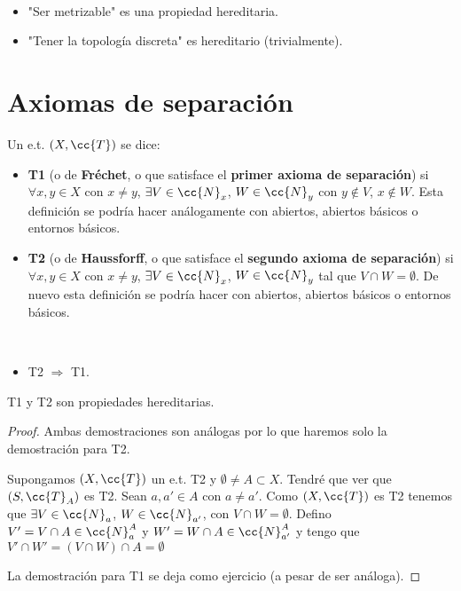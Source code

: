 \begin{ejemplo}\
    \begin{itemize}
        \item "Ser metrizable" es una propiedad hereditaria.
        \item "Tener la topología discreta" es hereditario (trivialmente).
    \end{itemize}
    \endsquare
\end{ejemplo}

\section{Axiomas de separación}

\begin{definicion}
    Un e.t. $(X, \cc{T})$ se dice:
    \begin{itemize}
        \item \textbf{T1} (o de \textbf{Fréchet}, o que satisface el \textbf{primer axioma de separación}) si $\forall x,y \in X$ con $x\neq y$, $\exists V \in \cc{N}_x$, $W\in \cc{N}_y$ con $y\notin V$, $x\notin W$. %
        Esta definición se podría hacer análogamente con abiertos, abiertos básicos o entornos básicos.

        \item \textbf{T2} (o de \textbf{Haussforff}, o que satisface el \textbf{segundo axioma de separación}) si $\forall x,y \in X$ con $x\neq y$, $\exists V \in \cc{N}_x$, $W\in \cc{N}_y$ tal que $V\cap W = \emptyset$. %
        De nuevo esta definición se podría hacer con abiertos, abiertos básicos o entornos básicos.
    \end{itemize}
    \endsquare
\end{definicion}

\begin{observacion}\
    \begin{itemize}
        \item T2 $\Rightarrow$ T1.
    \end{itemize}
    \endsquare
\end{observacion}

\begin{prop}
    T1 y T2 son propiedades hereditarias.
    \begin{proof}
        Ambas demostraciones son análogas por lo que haremos solo la demostración para T2. 

        Supongamos $(X, \cc{T})$ un e.t. T2 y $\emptyset \neq A \subset X$. Tendré que ver que $(S, \cc{T}_A)$ es T2. Sean $a,a'\in A$ con $a\neq a'$. Como $(X, \cc{T})$ es T2 tenemos que $\exists V \in \cc{N}_a$, $W\in \cc{N}_{a'}$, con $V\cap W = \emptyset$. Defino $V'=V\cap A \in \cc{N}_a^A$ y $W'=W\cap A \in \cc{N}_{a'}^A$ y tengo que $V'\cap W' = (V\cap W)\cap A = \emptyset$

        La demostración para T1 se deja como ejercicio (a pesar de ser análoga).
    \end{proof}
\end{prop}

